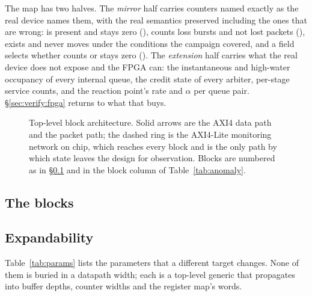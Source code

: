 The map has two halves. The \emph{mirror} half carries counters named exactly as
the real device names them, with the real semantics preserved including the ones
that are wrong:  is present and stays zero
(),  counts loss bursts and not lost packets
(),  exists and never moves under the conditions
the campaign covered, and a  field selects whether
 counts or stays zero (). The
\emph{extension} half carries what the real device does not expose and the FPGA
can: the instantaneous and high-water occupancy of every internal queue, the
credit state of every arbiter, per-stage service counts, and the reaction
point's rate and $\alpha$ per queue pair. \S\ref{sec:verify:fpga} returns to
what that buys.

\begin{figure}[t]
  \centering
  
  \caption{Top-level block architecture. Solid arrows are the AXI4 data path
    and the packet path; the dashed ring is the AXI4-Lite monitoring network on
    chip, which reaches every block and is the only path by which state leaves
    the design for observation. Blocks are numbered as in
    \S\ref{sec:arch:blocks} and in the block column of
    Table~\ref{tab:anomaly}.}
  \label{fig:arch}
\end{figure}

\subsection{The blocks}
\label{sec:arch:blocks}



\subsection{Expandability}
\label{sec:arch:expand}

Table~\ref{tab:params} lists the parameters that a different target changes.
None of them is buried in a datapath width; each is a top-level generic that
propagates into buffer depths, counter widths and the register map's
 words.

